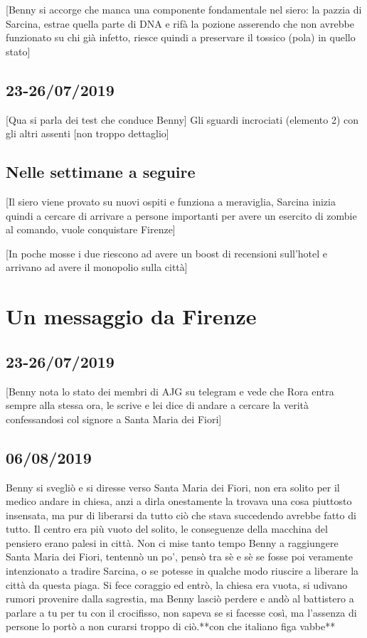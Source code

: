 [Benny si accorge che manca una componente fondamentale nel siero: la pazzia di Sarcina, estrae quella parte di DNA e rifà la pozione asserendo che non avrebbe funzionato su chi già infetto, riesce quindi a preservare il tossico (pola) in quello stato]


\subsection*{23-26/07/2019}
[Qua si parla dei test che conduce Benny]
Gli sguardi incrociati (elemento 2) con gli altri assenti [non troppo dettaglio]


\subsection*{Nelle settimane a seguire}
[Il siero viene provato su nuovi ospiti e funziona a meraviglia, Sarcina inizia quindi a cercare di arrivare a persone importanti per avere un esercito di zombie al comando, vuole conquistare Firenze]

[In poche mosse i due riescono ad avere un boost di recensioni sull'hotel e arrivano ad avere il monopolio sulla città]


\section{Un messaggio da Firenze}

\subsection*{23-26/07/2019}

[Benny nota lo stato dei membri di AJG su telegram e vede che Rora entra sempre alla stessa ora, le scrive e lei dice di andare a cercare la verità confessandosi col signore a Santa Maria dei Fiori]
\subsection*{06/08/2019}

Benny si svegliò e si diresse verso Santa Maria dei Fiori, non era solito per il medico andare in chiesa, anzi a dirla onestamente la trovava una cosa piuttosto insensata, ma pur di liberarsi da tutto ciò che stava succedendo avrebbe fatto di tutto. Il centro era più vuoto del solito, le conseguenze della macchina del pensiero erano palesi in città. Non ci mise tanto tempo Benny a raggiungere Santa Maria dei Fiori, tentennò un po', pensò tra sè e sè se fosse poi veramente intenzionato a tradire Sarcina, o se potesse in qualche modo riuscire a liberare la città da questa piaga. Si fece coraggio ed entrò, la chiesa era vuota, si udivano rumori provenire dalla sagrestia, ma Benny lasciò perdere e andò al battistero a parlare a tu per tu con il crocifisso, non sapeva se si facesse così, ma l'assenza di persone lo portò a non curarsi troppo di ciò.**con che italiano figa vabbe**

